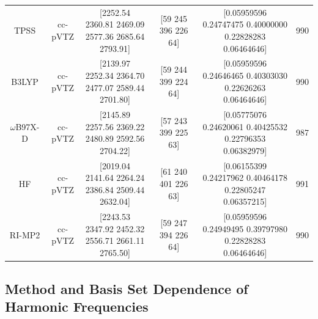 \begin{landscape}
\begin{table}
\begin{tabular}{cccccc}
      TPSS & cc-pVTZ & \makecell{[2252.54 2360.81 2469.09 \\ 2577.36 2685.64 2793.91]} & [59 245 396 226 64] & \makecell{[0.05959596 0.24747475 0.40000000 \\ 0.22828283 0.06464646]} & 990 \\
      B3LYP & cc-pVTZ & \makecell{[2139.97 2252.34 2364.70 \\ 2477.07 2589.44 2701.80]} & [59 244 399 224 64] & \makecell{[0.05959596 0.24646465 0.40303030 \\ 0.22626263 0.06464646]} & 990 \\
      \(\omega\)B97X-D & cc-pVTZ & \makecell{[2145.89 2257.56 2369.22 \\ 2480.89 2592.56 2704.22]} & [57 243 399 225 63] & \makecell{[0.05775076 0.24620061 0.40425532 \\ 0.22796353 0.06382979]} & 987 \\
      HF & cc-pVTZ & \makecell{[2019.04 2141.64 2264.24 \\ 2386.84 2509.44 2632.04]} & [61 240 401 226 63] & \makecell{[0.06155399 0.24217962 0.40464178 \\ 0.22805247 0.06357215]} & 991 \\
      RI-MP2 & cc-pVTZ & \makecell{[2243.53 2347.92 2452.32 \\ 2556.71 2661.11 2765.50]} & [59 247 394 226 64] & \makecell{[0.05959596 0.24949495 0.39797980 \\ 0.22828283 0.06464646]} & 990 \\
      \bottomrule
    \end{tabular}
  \end{table}
\end{landscape}

\subsection{Method and Basis Set Dependence of Harmonic Frequencies}
\label{paper_02:ssec:SI3}

